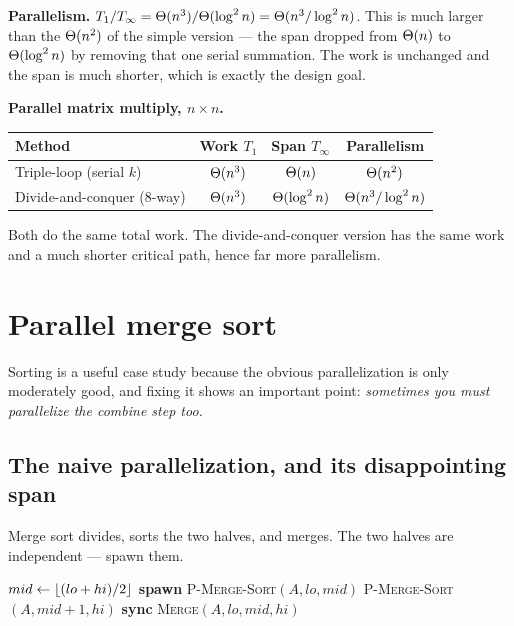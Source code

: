 \textbf{Parallelism.} $T_1/T_\infty = \Theta(n^3)/\Theta(\log^2 n) = \Theta(n^3/\log^2 n)$.
This is much larger than the $\Theta(n^2)$ of the simple version --- the span
dropped from $\Theta(n)$ to $\Theta(\log^2 n)$ by removing that one serial summation.
The work is unchanged and the span is much shorter, which is exactly the design
goal.

\begin{complexitybox}
\textbf{Parallel matrix multiply, $n \times n$.}
\begin{center}
\begin{tabular}{lccc}
\toprule
Method & Work $T_1$ & Span $T_\infty$ & Parallelism \\
\midrule
Triple-loop (serial $k$) & $\Theta(n^3)$ & $\Theta(n)$ & $\Theta(n^2)$ \\
Divide-and-conquer (8-way) & $\Theta(n^3)$ & $\Theta(\log^2 n)$ & $\Theta(n^3/\log^2 n)$ \\
\bottomrule
\end{tabular}
\end{center}
Both do the same total work. The divide-and-conquer version has the same work and
a much shorter critical path, hence far more parallelism.
\end{complexitybox}

\section{Parallel merge sort}

Sorting is a useful case study because the obvious parallelization is only
moderately good, and fixing it shows an important point: \emph{sometimes you must
parallelize the combine step too.}

\subsection{The naive parallelization, and its disappointing span}

Merge sort divides, sorts the two halves, and merges. The two halves are
independent --- spawn them.

\begin{algorithm}[H]
\caption{\textsc{P-Merge-Sort}$(A, lo, hi)$}
$mid \gets \lfloor(lo+hi)/2\rfloor$\;
\textbf{spawn} \textsc{P-Merge-Sort}$(A, lo, mid)$
\textsc{P-Merge-Sort}$(A, mid+1, hi)$
\textbf{sync}\;
\textsc{Merge}$(A, lo, mid, hi)$
\end{algorithm}

